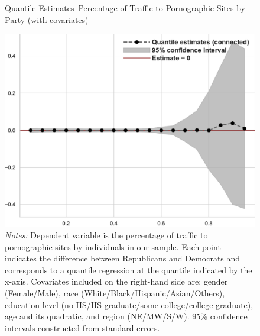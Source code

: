 \documentclass[12pt, letterpaper]{article}
\begin{document}
\begin{figure}
	\centering
	\caption{Quantile Estimates--Percentage of Traffic to Pornographic Sites by Party (with covariates)}
	\includegraphics[width=.55\linewidth]{../figs/quantile_reg_covariates_proportion_visits_adult.pdf}
	\caption*{\footnotesize \emph{Notes:} 
		Dependent variable is the percentage of traffic to pornographic sites by individuals in our sample.
		Each point indicates the difference between Republicans and Democrats and corresponds to a quantile regression at the quantile indicated by the x-axis.
		Covariates included on the right-hand side are: gender (Female/Male), race (White/Black/Hispanic/Asian/Others), education level (no HS/HS graduate/some college/college graduate), age and its quadratic, and region (NE/MW/S/W).
		95\% confidence intervals constructed from standard errors.
	}
	\label{fig:quantile_regression_prop_visits_covariates}
\end{figure}
\end{document}
